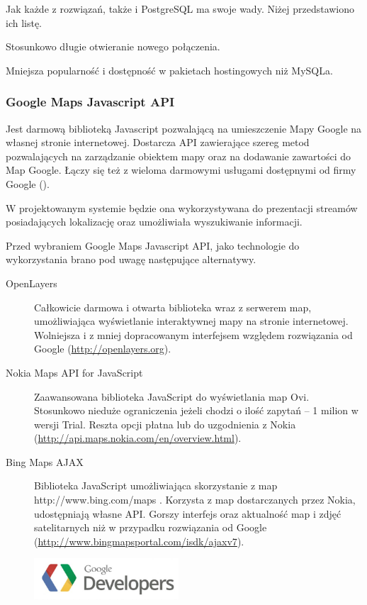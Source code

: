 Jak każde z rozwiązań, także i PostgreSQL ma swoje wady. Niżej przedstawiono ich listę.
\begin{packed_item}
    \item{Stosunkowo długie otwieranie nowego połączenia.}
    \item{Mniejsza popularność i dostępność w pakietach hostingowych niż MySQLa.}
\end{packed_item}

\newpage
\subsubsection{Google Maps Javascript API}
Jest darmową biblioteką Javascript pozwalającą na umieszczenie Mapy Google na własnej stronie internetowej. Dostarcza API zawierające szereg metod pozwalających na zarządzanie obiektem mapy oraz na dodawanie zawartości do Map Google. Łączy się też z wieloma darmowymi usługami dostępnymi od firmy Google  (\cite{GoogleMapsJsAPI}).

W projektowanym systemie będzie ona wykorzystywana do prezentacji streamów posiadających lokalizację oraz umożliwiała wyszukiwanie informacji.

Przed wybraniem Google Maps Javascript API, jako technologie do wykorzystania brano pod uwagę następujące alternatywy.
\begin{description}
    \item[OpenLayers] Całkowicie darmowa i otwarta biblioteka wraz z serwerem map, umożliwiająca wyświetlanie interaktywnej mapy na stronie internetowej. Wolniejsza i z mniej dopracowanym interfejsem względem rozwiązania od Google (\url{http://openlayers.org}).
    \item[Nokia Maps API for JavaScript] Zaawansowana biblioteka JavaScript do wyświetlania map Ovi. Stosunkowo nieduże ograniczenia jeżeli chodzi o ilość zapytań -- 1 milion w wersji Trial. Reszta opcji płatna lub do uzgodnienia z Nokia (\url{http://api.maps.nokia.com/en/overview.html}).
    \item[Bing Maps AJAX] Biblioteka JavaScript umożliwiająca skorzystanie z map http://www.bing.com/maps . Korzysta z map dostarczanych przez Nokia, udostępniają własne API. Gorszy interfejs oraz aktualność map i zdjęć satelitarnych niż w przypadku rozwiązania od Google (\url{http://www.bingmapsportal.com/isdk/ajaxv7}).
\end{description}

\begin{figure}
  \begin{center}
    \includegraphics[width=0.48\textwidth]{img/logos/google-maps-api.jpg}
  \end{center}
\end{figure}


